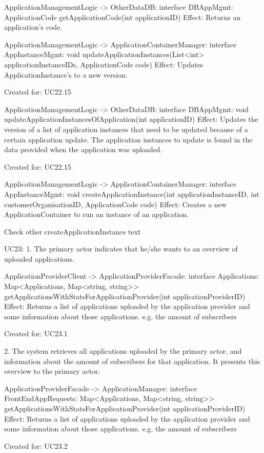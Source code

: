             ApplicationManagementLogic -> OtherDataDB: interface DBAppMgmt: ApplicationCode getApplicationCode(int applicationID)
                Effect: Returns an application's code.

            ApplicationManagementLogic -> ApplicationContainerManager: interface AppInstanceMgmt: void updateApplicationInstances(List<int> applicationInstanceIDs, ApplicationCode code)
                Effect: Updates ApplicationInstance's to a new version.
                \item Created for: UC22.15

            ApplicationManagementLogic -> OtherDataDB: interface DBAppMgmt: void updateApplicationInstancesOfApplication(int applicationID)
                Effect: Updates the version of a list of application instances that need to be updated because of a certain application update. The application instances to update is found in the data provided when the application was uploaded.
                \item Created for: UC22.15

        ApplicationManagementLogic -> ApplicationContainerManager: interface AppInstanceMgmt: void createApplicationInstance(int applicationInstanceID, int customerOrganisationID, ApplicationCode code)
            Effect: Creates a new ApplicationContainer to run an instance of an application.

        Check other createApplicationInstance text


    UC23:
        1. The primary actor indicates that he/she wants to an overview of uploaded applications.

            ApplicationProviderClient -> ApplicationProviderFacade: interface Applications: Map<Applications, Map<string, string>> getApplicationsWithStatsForApplicationProvider(int applicationProviderID)
                Effect: Returns a list of applications uploaded by the application provider and some information about those applications. e.g. the amount of subscribers
                \item Created for: UC23.1

        2. The system retrieves all applications uploaded by the primary actor, and information about the amount of subscribers for that application. It presents this overview to the primary actor.

            ApplicationProviderFacade -> ApplicationManager: interface FrontEndAppRequests: Map<Applications, Map<string, string>> getApplicationsWithStatsForApplicationProvider(int applicationProviderID)
                Effect: Returns a list of applications uploaded by the application provider and some information about those applications. e.g. the amount of subscribers
                \item Created for: UC23.2

